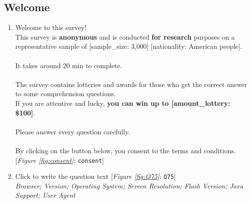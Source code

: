 \subsection*{Welcome} 
 \begin{enumerate} 
\item  \label{q:consent} Welcome to this survey!\\
This survey is \textbf{anonymous }and is conducted \textbf{for research} purposes on a representative sample of [sample\_size: 3,000] [nationality: American people].\\
~\\
It takes around 20 min to complete.\\
~\\
The survey contains lotteries and awards for those who get the correct answer to some comprehension questions.\\
If you are attentive and lucky, \textbf{you can win up to [amount\_lottery: \$100]}.\\
~\\
Please answer every question carefully.\\
~\\
By clicking on the button below, you consent to the terms and conditions. [\textit{Figure \ref{fig:consent}}; 
\verb|consent|]


\item  \label{q:Q75} Click to write the question text [\textit{Figure \ref{fig:Q75}}; 
\verb|Q75|]
  \\ \textit{Browser; Version; Operating System; Screen Resolution; Flash Version; Java Support; User Agent}

\end{enumerate} 


